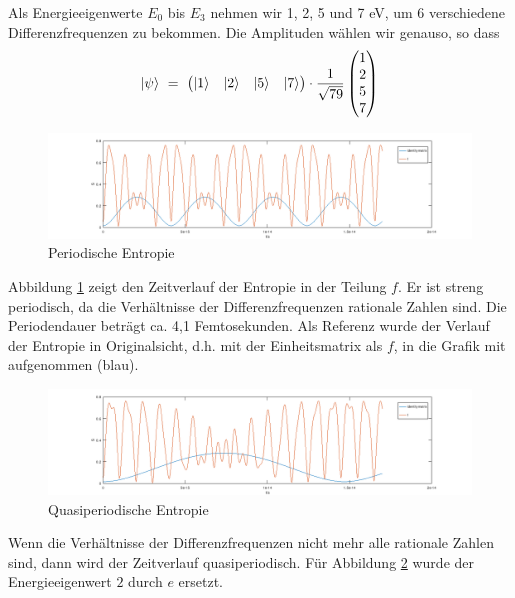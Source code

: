 \documentclass[12pt]{article}
\begin{document}
Als Energieeigenwerte $E_0$ bis $E_3$ nehmen wir 1, 2, 5 und 7 eV, um 6 verschiedene Differenzfrequenzen zu bekommen. Die Amplituden wählen wir genauso, so dass
\begin{equation*}
\ket{\psi}\ =\ \begin{pmatrix}
\ket{1} & \ket{2} & \ket{5} & \ket{7}
\end{pmatrix}
\cdot \frac{1}{\sqrt{79}}
\begin{pmatrix}
1 \\ 2 \\ 5 \\ 7
\end{pmatrix}
\end{equation*}
\begin{figure}[!h]\begin{center}
  \includegraphics[width=20cm]{periodic_entropy.png}
  \caption{Periodische Entropie}
  \label{fig:periodic_entropy}
\end{center}\end{figure}

Abbildung \ref{fig:periodic_entropy} zeigt den Zeitverlauf der Entropie in der Teilung $f$. Er ist streng periodisch, da die Verhältnisse der Differenzfrequenzen rationale Zahlen sind. Die Periodendauer beträgt ca. 4,1 Femtosekunden.
Als Referenz wurde der Verlauf der Entropie in Originalsicht, d.h. mit der Einheitsmatrix als $f$, in die Grafik mit aufgenommen (blau).
\begin{figure}[!h]\begin{center}
  \includegraphics[width=20cm]{quasi_periodic_entropy.png}
  \caption{Quasiperiodische Entropie}
  \label{fig:quasi_periodic_entropy}
\end{center}\end{figure}

Wenn die Verhältnisse der Differenzfrequenzen nicht mehr alle rationale Zahlen sind, dann wird der Zeitverlauf quasiperiodisch. Für Abbildung \ref{fig:quasi_periodic_entropy} wurde der Energieeigenwert $2$ durch $e$ ersetzt.
\end{document}
